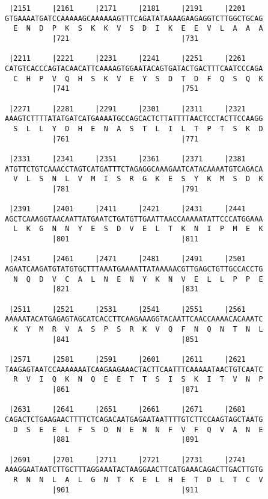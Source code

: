 \documentclass{article}
\begin{document}
\begin{Verbatim}
 |2151     |2161     |2171     |2181     |2191     |2201    
GTGAAAATGATCCAAAAAGCAAAAAAGTTTCAGATATAAAAGAAGAGGTCTTGGCTGCAG
  E  N  D  P  K  S  K  K  V  S  D  I  K  E  E  V  L  A  A  A
           |721                          |731               
  
 |2211     |2221     |2231     |2241     |2251     |2261    
CATGTCACCCAGTACAACATTCAAAAGTGGAATACAGTGATACTGACTTTCAATCCCAGA
  C  H  P  V  Q  H  S  K  V  E  Y  S  D  T  D  F  Q  S  Q  K
           |741                          |751               
  
 |2271     |2281     |2291     |2301     |2311     |2321    
AAAGTCTTTTATATGATCATGAAAATGCCAGCACTCTTATTTTAACTCCTACTTCCAAGG
  S  L  L  Y  D  H  E  N  A  S  T  L  I  L  T  P  T  S  K  D
           |761                          |771               
  
 |2331     |2341     |2351     |2361     |2371     |2381    
ATGTTCTGTCAAACCTAGTCATGATTTCTAGAGGCAAAGAATCATACAAAATGTCAGACA
  V  L  S  N  L  V  M  I  S  R  G  K  E  S  Y  K  M  S  D  K
           |781                          |791               
  
 |2391     |2401     |2411     |2421     |2431     |2441    
AGCTCAAAGGTAACAATTATGAATCTGATGTTGAATTAACCAAAAATATTCCCATGGAAA
  L  K  G  N  N  Y  E  S  D  V  E  L  T  K  N  I  P  M  E  K
           |801                          |811               
  
 |2451     |2461     |2471     |2481     |2491     |2501    
AGAATCAAGATGTATGTGCTTTAAATGAAAATTATAAAAACGTTGAGCTGTTGCCACCTG
  N  Q  D  V  C  A  L  N  E  N  Y  K  N  V  E  L  L  P  P  E
           |821                          |831               
  
 |2511     |2521     |2531     |2541     |2551     |2561    
AAAAATACATGAGAGTAGCATCACCTTCAAGAAAGGTACAATTCAACCAAAACACAAATC
  K  Y  M  R  V  A  S  P  S  R  K  V  Q  F  N  Q  N  T  N  L
           |841                          |851               
  
 |2571     |2581     |2591     |2601     |2611     |2621    
TAAGAGTAATCCAAAAAAATCAAGAAGAAACTACTTCAATTTCAAAAATAACTGTCAATC
  R  V  I  Q  K  N  Q  E  E  T  T  S  I  S  K  I  T  V  N  P
           |861                          |871               
  
 |2631     |2641     |2651     |2661     |2671     |2681    
CAGACTCTGAAGAACTTTTCTCAGACAATGAGAATAATTTTGTCTTCCAAGTAGCTAATG
  D  S  E  E  L  F  S  D  N  E  N  N  F  V  F  Q  V  A  N  E
           |881                          |891               
  
 |2691     |2701     |2711     |2721     |2731     |2741    
AAAGGAATAATCTTGCTTTAGGAAATACTAAGGAACTTCATGAAACAGACTTGACTTGTG
  R  N  N  L  A  L  G  N  T  K  E  L  H  E  T  D  L  T  C  V
           |901                          |911               
  

\end{Verbatim}
\end{document}
